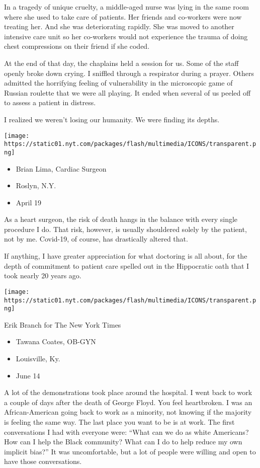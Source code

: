 In a tragedy of unique cruelty, a middle-aged nurse was lying in the
same room where she used to take care of patients. Her friends and
co-workers were now treating her. And she was deteriorating rapidly. She
was moved to another intensive care unit so her co-workers would not
experience the trauma of doing chest compressions on their friend if she
coded.

At the end of that day, the chaplains held a session for us. Some of the
staff openly broke down crying. I sniffled through a respirator during a
prayer. Others admitted the horrifying feeling of vulnerability in the
microscopic game of Russian roulette that we were all playing. It ended
when several of us peeled off to assess a patient in distress.

I realized we weren't losing our humanity. We were finding its depths.

\texttt{[image: https://static01.nyt.com/packages/flash/multimedia/ICONS/transparent.png]}

\begin{itemize}
\tightlist
\item
  Brian Lima, Cardiac Surgeon
\item
  Roslyn, N.Y.
\item
  April 19
\end{itemize}

As a heart surgeon, the risk of death hangs in the balance with every
single procedure I do. That risk, however, is usually shouldered solely
by the patient, not by me. Covid-19, of course, has drastically altered
that.

If anything, I have greater appreciation for what doctoring is all
about, for the depth of commitment to patient care spelled out in the
Hippocratic oath that I took nearly 20 years ago.

\texttt{[image: https://static01.nyt.com/packages/flash/multimedia/ICONS/transparent.png]}

Erik Branch for The New York Times

\begin{itemize}
\tightlist
\item
  Tawana Coates, OB-GYN
\item
  Louisville, Ky.
\item
  June 14
\end{itemize}

A lot of the demonstrations took place around the hospital. I went back
to work a couple of days after the death of George Floyd. You feel
heartbroken. I was an African-American going back to work as a minority,
not knowing if the majority is feeling the same way. The last place you
want to be is at work. The first conversations I had with everyone were:
``What can we do as white Americans? How can I help the Black community?
What can I do to help reduce my own implicit bias?'' It was
uncomfortable, but a lot of people were willing and open to have those
conversations.

